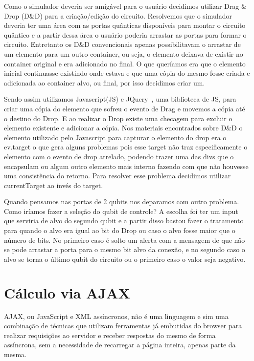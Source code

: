 \documentclass[a4paper, 12pt, oneside]{book}
\begin{document}
Como o simulador deveria ser amigável para o usuário decidimos utilizar Drag \& Drop (D\&{D}) para a criação/edição do circuito. Resolvemos que o simulador deveria ter uma área com as portas quânticas disponíveis para montar o circuito quântico e a partir dessa área o usuário poderia arrastar as portas para formar o circuito. Entretanto os D\&{D} convencionais apenas possibilitavam o arrastar de um elemento para um outro container, ou seja, o elemento deixava de existir no container original e era adicionado no final. O que queríamos era que o elemento inicial continuasse existindo onde estava e que uma cópia do mesmo fosse criada e adicionada ao container alvo, ou final, por isso decidimos criar um.

Sendo assim utilizamos Javascript(JS) e JQuery~\cite{jquery}, uma biblioteca de JS, para criar uma cópia do elemento que sofreu o evento de Drag e movemos a cópia até o destino do Drop. E ao realizar o Drop existe uma checagem para excluir o elemento existente e adicionar a cópia. Nos materiais encontrados sobre D\&{D} o elemento utilizado pelo Javascript para capturar o elemento do drop era o ev.target o que gera alguns problemas pois esse target não traz especificamente o elemento com o evento de drop atrelado, podendo trazer uma das divs que o encapsulam ou algum outro elemento mais interno fazendo com que não houvesse uma consistência do retorno. Para resolver esse problema decidimos utilizar currentTarget ao invés do target.

Quando pensamos nas portas de 2 qubits nos deparamos com outro problema. Como iríamos fazer a seleção do qubit de controle? A escolha foi ter um input que serviria de alvo do segundo qubit e a partir disso bastou fazer o tratamento para quando o alvo era igual ao bit do Drop ou caso o alvo fosse maior que o número de bits. No primeiro caso é solto um alerta com a mensagem de que não se pode arrastar a porta para o mesmo bit alvo da conexão, e no segundo caso o alvo se torna o último qubit do circuito ou o primeiro caso o valor seja negativo.

\section{Cálculo via AJAX}

AJAX, ou JavaScript e XML assíncronos, não é uma linguagem e sim uma combinação de técnicas que utilizam ferramentas já embutidas do browser para realizar requisições ao servidor e receber respostas do mesmo de forma assíncrona, sem a necessidade de recarregar a página inteira, apenas parte da mesma.
\end{document}
